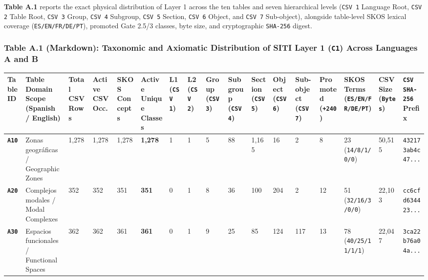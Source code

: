 \documentclass[10pt,a4paper]{article}
\begin{document}
\textbf{Table A.1} reports the exact physical distribution of Layer 1 across the ten tables and seven hierarchical levels (\texttt{CSV 1} Language Root, \texttt{CSV 2} Table Root, \texttt{CSV 3} Group, \texttt{CSV 4} Subgroup, \texttt{CSV 5} Section, \texttt{CSV 6} Object, and \texttt{CSV 7} Sub-object), alongside table-level SKOS lexical coverage (\texttt{ES/EN/FR/DE/PT}), promoted Gate 2.5/3 classes, byte size, and cryptographic \texttt{SHA-256} digest.

\subsubsection*{Table A.1 (Markdown): Taxonomic and Axiomatic Distribution of SITI Layer 1 (\texttt{C1}) Across Languages A and B}

{\scriptsize
\begin{longtable}{p{}p{}p{}p{}p{}p{}p{}p{}p{}p{}p{}p{}p{}p{}p{}p{}p{}}
\toprule
\textbf{Table ID} & \textbf{Table Domain Scope (Spanish / English)} & \textbf{Total CSV Rows} & \textbf{Active CSV Occ.} & \textbf{SKOS Concepts} & \textbf{Active Unique Classes} & \textbf{L1 (\texttt{CSV 1})} & \textbf{L2 (\texttt{CSV 2})} & \textbf{Group (\texttt{CSV 3})} & \textbf{Subgroup (\texttt{CSV 4})} & \textbf{Section (\texttt{CSV 5})} & \textbf{Object (\texttt{CSV 6})} & \textbf{Sub-object (\texttt{CSV 7})} & \textbf{Promoted (\texttt{+240})} & \textbf{SKOS Terms (\texttt{ES/EN/FR/DE/PT})} & \textbf{CSV Size (\texttt{Bytes})} & \textbf{\texttt{CSV} \texttt{SHA-256} Prefix} \\
\midrule
\endhead
\textbf{\texttt{A10}} & Zonas geográficas / Geographic Zones & 1,278 & 1,278 & 1,278 & \textbf{1,278} & 1 & 1 & 5 & 88 & 1,165 & 16 & 2 & 8 & 23 (\texttt{14/8/1/0/0}) & 50,515 & \texttt{432173ab4c47...} \\
\textbf{\texttt{A20}} & Complejos modales / Modal Complexes & 352 & 352 & 351 & \textbf{351} & 0 & 1 & 8 & 36 & 100 & 204 & 2 & 12 & 51 (\texttt{32/16/3/0/0}) & 22,103 & \texttt{cc6cfd634423...} \\
\textbf{\texttt{A30}} & Espacios funcionales / Functional Spaces & 362 & 362 & 361 & \textbf{361} & 0 & 1 & 9 & 25 & 85 & 124 & 117 & 13 & 78 (\texttt{40/25/11/1/1}) & 22,047 & \texttt{3ca22b76a04a...} \\

\end{longtable}}
\end{document}
